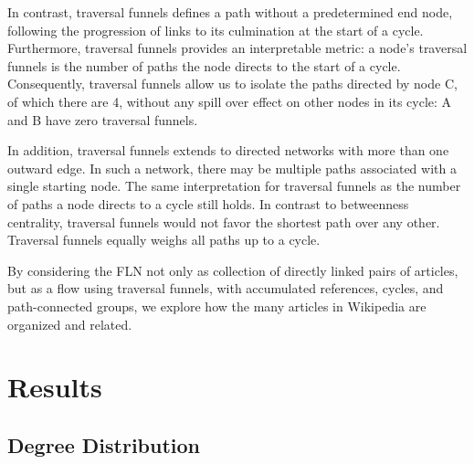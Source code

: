 \documentclass[pre,twocolumn,twoside,superscriptaddress,floatfix]{revtex4-1}
\begin{document}
{In contrast, traversal funnels defines a path without a predetermined end node, following the progression of links to its culmination at the start of a cycle. Furthermore, traversal funnels provides an interpretable metric: a node's traversal funnels is the number of paths the node directs to the start of a cycle. 
Consequently, traversal funnels allow us to isolate the paths directed by node C, of which there are 4, without any spill over effect on other nodes in its cycle: A and B have zero traversal funnels. 

In addition, traversal funnels extends to directed networks with more than one outward edge. In such a network, there may be multiple paths associated with a single starting node. 
The same interpretation for traversal funnels as the number of paths a node directs to a cycle still holds. 
In contrast to betweenness centrality, traversal funnels would not favor the shortest path over any other. Traversal funnels equally weighs all paths up to a cycle. 

By considering the FLN not only as collection of directly linked pairs of articles, but
as a flow using traversal funnels, with accumulated references, cycles, and path-connected groups, we explore how the many articles in Wikipedia are organized and related.

\section{Results}
\subsection{Degree Distribution}

}
\end{document}
